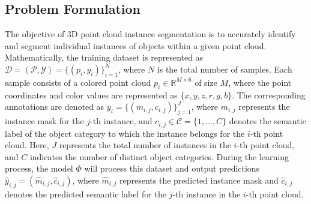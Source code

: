 \subsection{Problem Formulation}
\label{sec:formulation}

The objective of 3D point cloud instance segmentation is to accurately identify and segment individual instances of objects within a given point cloud. Mathematically, the training dataset is represented as $\mathcal{D} = (\mathcal{P}, \mathcal{Y}) = \{(p_i, y_i)\}_{i=1}^N$, where $N$ is the total number of samples. Each sample consists of a colored point cloud $p_i \in \mathbb{R}^{M \times 6}$ of size $M$, where the point coordinates and color values are represented as $\{x, y, z, r, g, b\}$. The corresponding annotations are denoted as $y_i = \{(m_{i,j}, c_{i,j})\}_{j=1}^J$, where $m_{i,j}$ represents the instance mask for the $j$-th instance, and $c_{i,j} \in \mathcal{C} = \{1, \dots, C\}$ denotes the semantic label of the object category to which the instance belongs for the $i$-th point cloud. Here, $J$ represents the total number of instances in the $i$-th point cloud, and $C$ indicates the number of distinct object categories. During the learning process, the model $\Phi$ will process this dataset and output predictions $\hat{y}_{i,j} = (\hat{m}_{i,j}, \hat{c}_{i,j})$, where $\hat{m}_{i,j}$ represents the predicted instance mask and $\hat{c}_{i,j}$ denotes the predicted semantic label for the $j$-th instance in the $i$-th point cloud.

